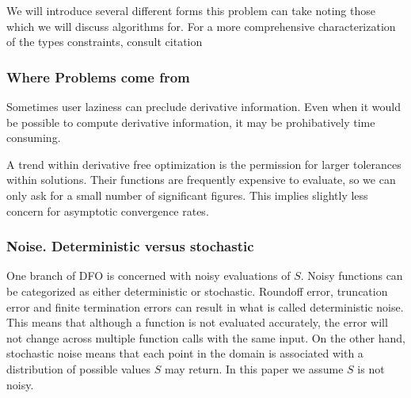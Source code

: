 \documentclass{article}
\begin{document}
We will introduce several different forms this problem can take noting those which we will discuss algorithms for.
For a more comprehensive characterization of the types constraints, consult \color{red}citation\color{black} %


\subsubsection{Where Problems come from}








Sometimes user laziness can preclude derivative information.
Even when it would be possible to compute derivative information, it may be prohibatively time consuming.

A trend within derivative free optimization is the permission for larger tolerances within solutions.
Their functions are frequently expensive to evaluate, so we can only ask for a small number of significant figures.
This implies slightly less concern for asymptotic convergence rates.


\subsubsection{Noise. Deterministic versus stochastic}

One branch of DFO is concerned with noisy evaluations of $S$.
Noisy functions can be categorized as either deterministic or stochastic.
Roundoff error, truncation error and finite termination errors can result in what is called deterministic noise.
This means that although a function is not evaluated accurately, the error will not change across multiple function calls with the same input.
On the other hand, stochastic noise means that each point in the domain is associated with a distribution of possible values $S$ may return.
In this paper we assume $S$ is not noisy.
\end{document}
